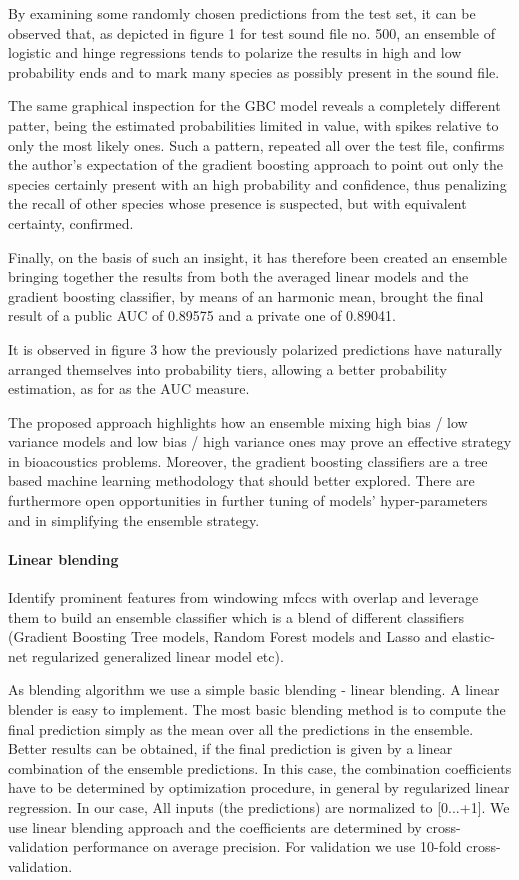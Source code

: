 By examining some randomly chosen predictions from the test set, it can be observed that, as
depicted in figure 1 for test sound file no. 500, an ensemble of logistic and hinge
regressions tends to polarize the results in high and low probability ends and to mark many
species as possibly present in the sound file.

The same graphical inspection for the GBC model reveals a completely different patter,
being the estimated probabilities limited in value, with spikes relative to only the most likely
ones. Such a pattern, repeated all over the test file, confirms the author’s expectation of the
gradient boosting approach to point out only the species certainly present with an high
probability and confidence, thus penalizing the recall of other species whose presence is
suspected, but with equivalent certainty, confirmed.

Finally, on the basis of such an insight, it has therefore been created an ensemble bringing
together the results from both the averaged linear models and the gradient boosting
classifier, by means of an harmonic mean, brought the final result of a public AUC of
0.89575 and a private one of 0.89041.

It is observed in figure 3 how the previously polarized predictions have naturally arranged
themselves into probability tiers, allowing a better probability estimation, as for as the AUC
measure.

The proposed approach highlights how an ensemble mixing high bias / low variance models
and low bias / high variance ones may prove an effective strategy in bioacoustics problems.
Moreover, the gradient boosting classifiers are a tree based machine learning methodology
that should better explored. There are
furthermore open opportunities in further tuning of models’ hyper-parameters and in
simplifying the ensemble strategy.

\paragraph{Linear blending \cite{chennovel13}}

Identify prominent features from windowing mfccs with overlap and leverage them to build an ensemble classifier which is a blend of different classifiers (Gradient Boosting Tree
models, Random Forest models and Lasso and elastic-net regularized generalized linear model etc). 

As blending algorithm we use a simple basic blending - linear blending. A linear blender is easy to
implement. The most basic blending method is to compute the final prediction simply as the mean
over all the predictions in the ensemble. Better results can be obtained, if the final prediction is
given by a linear combination of the ensemble predictions. In this case, the combination coefficients
have to be determined by optimization procedure, in general by regularized linear regression. In our
case, All inputs (the predictions) are normalized to [0...+1]. We use linear blending approach and
the coefficients are determined by cross-validation performance on average precision. For validation
we use 10-fold cross-validation.

